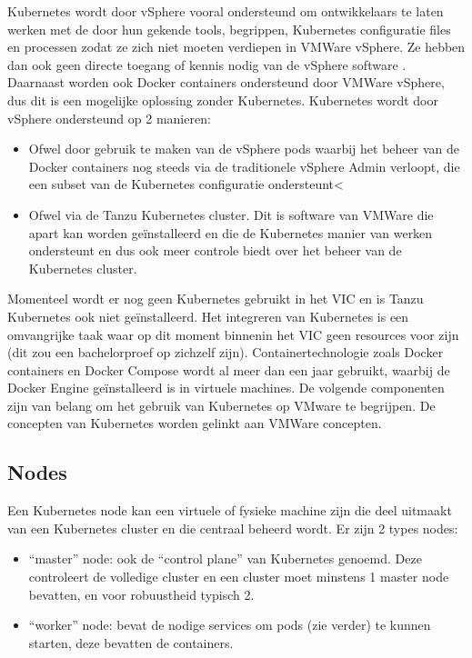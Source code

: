 \newline
\newline
Kubernetes wordt door vSphere vooral ondersteund om ontwikkelaars te laten werken met de door hun gekende tools, begrippen, Kubernetes configuratie files en processen zodat ze zich niet moeten verdiepen in VMWare vSphere. Ze hebben dan ook geen directe toegang of kennis nodig van de vSphere software \autocite{VMware2019}.
\newline
\newline
Daarnaast worden ook Docker containers ondersteund door VMWare vSphere, dus dit is een mogelijke oplossing zonder Kubernetes.
\newline
\newline
Kubernetes wordt door vSphere ondersteund op 2 manieren: 
\begin{itemize}
    \item Ofwel door gebruik te maken van de vSphere pods waarbij het beheer van de Docker containers nog steeds via de traditionele vSphere Admin verloopt, die een subset van de Kubernetes configuratie ondersteunt<
    \item Ofwel via de Tanzu Kubernetes cluster. Dit is software van VMWare die apart kan worden geïnstalleerd en die de Kubernetes manier van werken ondersteunt en dus ook meer controle biedt over het beheer van de Kubernetes cluster.
\end{itemize}

Momenteel wordt er nog geen Kubernetes gebruikt in het VIC en is Tanzu Kubernetes ook niet geïnstalleerd. Het integreren van Kubernetes is een omvangrijke taak waar op dit moment binnenin het VIC geen resources voor zijn (dit zou een bachelorproef op zichzelf zijn).
\newline
Containertechnologie zoals Docker containers en Docker Compose wordt al meer dan een jaar gebruikt, waarbij de Docker Engine geïnstalleerd is in virtuele machines.
\newline
\newline
De volgende componenten zijn van belang om het gebruik van Kubernetes op VMware te begrijpen. De concepten van Kubernetes worden gelinkt aan VMWare concepten.

\subsection{Nodes}
Een Kubernetes node kan een virtuele of fysieke machine zijn die deel uitmaakt van een Kubernetes cluster en die centraal beheerd wordt.
Er zijn 2 types nodes:
\begin{itemize}
    \item ``master'' node: ook de ``control plane'' van Kubernetes genoemd. Deze controleert de volledige cluster en een cluster moet minstens 1 master node bevatten, en voor robuustheid typisch 2.
    \item ``worker'' node: bevat de nodige services om pods (zie verder) te kunnen starten, deze bevatten de containers.
\end{itemize}
\autocite{NirShtein2023}
